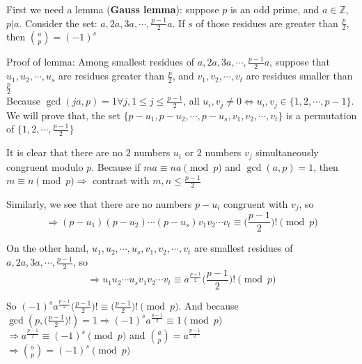 \begin{exer}[3.38] First we need a lemma (\textbf{Gauss lemma}): suppose $p$ is an odd prime, and $a \in \mathbb{Z}$, $p|a$. Consider the set: $a, 2a, 3a, \cdots, \frac{p-1}{2}a$. If $s$ of those residues are greater than $\frac{p}{2}$, then $\binom{a}{p} = (-1)^s$
	
	Proof of lemma: Among smallest residues of $a, 2a, 3a, \cdots, \frac{p-1}{2}a$, suppose that $u_1, u_2, \cdots, u_s$ are residues greater than $\frac{p}{2}$, and $v_1, v_2, \cdots, v_t$ are residues smaller than $\frac{p}{2}$ \\ Because $\gcd(ja, p)=1 \forall j, 1 \leq j \leq \frac{p-1}{2}$, all $u_i, v_j \neq 0 \Leftrightarrow u_i, v_j \in \{1,2,\cdots,p-1\}$. We will prove that, the set $\{p-u_1, p-u_2, \cdots, p-u_s, v_1, v_2, \cdots, v_t\}$ is a permutation of $\{1,2,\cdots,\frac{p-1}{2}\}$
	
	It is clear that there are no 2 numbers $u_i$ or 2 numbers $v_j$ simultaneously congruent modulo $p$. Because if $ma \equiv na \pmod p$ and $\gcd(a,p)=1$, then $m\equiv n \pmod p \Rightarrow$ contrast with $m,n \leq \frac{p-1}{2}$
	
	Similarly, we see that there are no numbers $p-u_i$ congruent with $v_j$, so $$\Rightarrow (p-u_1)(p-u_2)\cdots(p-u_s)v_1 v_2 \cdots v_t \equiv \Big(\frac{p-1}{2}\Big)! \pmod p$$
	
	On the other hand, $u_1,u_2,\cdots,u_s, v_1, v_2, \cdots, v_t$ are smallest residues of $a, 2a, 3a, \cdots, \frac{p-1}{2}$, so $$\Rightarrow u_1 u_2 \cdots u_s v_1 v_2 \cdots v_t \equiv a^{\frac{p-1}{2}} \Big(\frac{p-1}{2}\Big)! \pmod p$$
	
	So $(-1)^s a^{\frac{p-1}{2}} \Big(\frac{p-1}{2}\Big)! \equiv \Big(\frac{p-1}{2}\Big)! \pmod p$. And because $\gcd(p, \Big(\frac{p-1}{2}\Big)!) = 1 \Rightarrow (-1)^s a^{\frac{p-1}{2}} \equiv 1 \pmod p$ \\ $\Rightarrow a^{\frac{p-1}{2}} \equiv (-1)^s \pmod p$ and $\binom{a}{p} = a^{\frac{p-1}{2}}$ \\ $\Rightarrow \binom{a}{p} = (-1)^s \pmod p$
\end{exer}